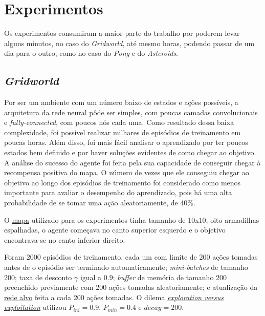 \section{Experimentos}
\label{sec:exp}

Os experimentos consumiram a maior parte do trabalho por poderem levar alguns minutos, no caso do \textit{Gridworld}, até mesmo horas, podendo passar de um dia para o outro, como no caso do \textit{Pong} e do \textit{Asteroids}.

\subsection{\textit{Gridworld}}
\label{sec:exp_gridworld}

Por ser um ambiente com um número baixo de estados e ações possíveis, a arquitetura da rede neural pôde ser simples, com poucas camadas convolucionais e \textit{fully-connected}, com poucos nós cada uma.
Como resultado dessa baixa complexidade, foi possível realizar milhares de episódios de treinamento em poucas horas.
Além disso, foi mais fácil analisar o aprendizado por ter poucos estados bem definido e por haver soluções evidentes de como chegar ao objetivo.
A análise do sucesso do agente foi feita pela sua capacidade de conseguir chegar à recompensa positiva do mapa.
O número de vezes que ele conseguiu chegar ao objetivo ao longo dos episódios de treinamento foi considerado como menos importante para avaliar o desempenho do aprendizado, pois há uma alta probabilidade de se tomar uma ação aleatoriamente, de 40\%.

O \hyperref[fig:env_grid]{mapa} utilizado para os experimentos tinha tamanho de 10x10, oito armadilhas espalhadas, o agente começava no canto superior esquerdo e o objetivo encontrava-se no canto inferior direito.

Foram 2000 episódios de treinamento, cada um com limite de 200 ações tomadas antes de o episódio ser terminado automaticamente;
\textit{mini-batches} de tamanho 200;
taxa de desconto $\gamma$ igual a $0.9$; 
\textit{buffer} de memória de tamanho 200 preenchido previamente com 200 ações tomadas aleatoriamente;
e atualização da \hyperref[sec:ft]{rede alvo} feita a cada 200 ações tomadas.
O dilema \hyperref[eq:exp_exp_prob]{\textit{exploration versus exploitation}} utilizou $P_{ini} = 0.9$, $P_{min} = 0.4$ e $decay = 200$.

